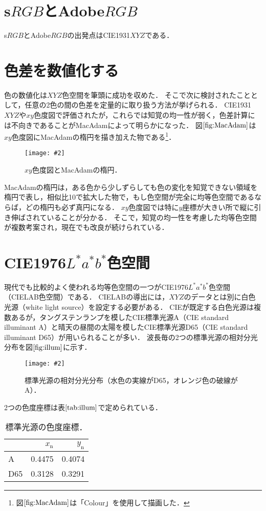 \documentclass[uplatex,paper=a4,fontsize=4.0truemm,jafontsize=4.0truemm,head_space=30.0truemm,foot_space=30.0truemm,baselineskip=8.0truemm,line_length=40zw,gutter=25.0truemm,oneside,openany,fleqn,hanging_panctuation,open_bracket_pos=nibu_tentsuki,dvipdfmx,jis2004,book,titlepage]{jlreq}
\theoremstyle{mystyle}
\newcommand{\captiondot}[1]{\caption{#1．}}
\newcommand{\figureinput}[4]{\begin{figure}[tbp]\centering\texttt{[image: \#2]}\captiondot{#3}\label{fig:#4}\end{figure}}
\newcommand{\tableinput}[4]{\begin{table}[tbp]\centering\captiondot{#3}\label{tab:#4}\begin{tabular}{#1}#2\end{tabular}\end{table}}
\newcommand{\mathdisplaystyle}[1]{\(\displaystyle{#1}\)}
\newcommand{\Reference}[1]{\mathdisplaystyle{\ref{#1}}}
\begin{document}
		\section{s\mathdisplaystyle{RGB}とAdobe\mathdisplaystyle{RGB}}
			s\mathdisplaystyle{RGB}とAdobe\mathdisplaystyle{RGB}の出発点はCIE1931\mathdisplaystyle{XYZ}である．
		\section{色差を数値化する}
			色の数値化は\mathdisplaystyle{XYZ}色空間を筆頭に成功を収めた．
			そこで次に検討されたこととして，任意の2色の間の色差を定量的に取り扱う方法が挙げられる．
			CIE1931\mathdisplaystyle{XYZ}や\mathdisplaystyle{xy}色度図で評価されたが，これらでは知覚の均一性が弱く，色差計算には不向きであることがMacAdamによって明らかになった\cite{MacAdam1942}．
			図\Reference{fig:MacAdam}は\mathdisplaystyle{xy}色度図にMacAdamの楕円を描き加えた物である\footnote{図\Reference{fig:MacAdam}は「Colour」を使用して描画した．}．
			\figureinput{width=\linewidth}{D:/a/figs/MacAdam.png}{\mathdisplaystyle{xy}色度図とMacAdamの楕円}{MacAdam}
			MacAdamの楕円は，ある色から少しずらしても色の変化を知覚できない領域を楕円で表し，相似比10で拡大した物で，もし色空間が完全に均等色空間であるならば，どの楕円も必ず真円になる．
			\mathdisplaystyle{xy}色度図では特に\mathdisplaystyle{y}座標が大きい所で縦に引き伸ばされていることが分かる．
			そこで，知覚の均一性を考慮した均等色空間が複数考案され，現在でも改良が続けられている．
		\section{CIE1976\mathdisplaystyle{L^\ast a^\ast b^\ast}色空間}
			現代でも比較的よく使われる均等色空間の一つがCIE1976\mathdisplaystyle{L^\ast a^\ast b^\ast}色空間（CIELAB色空間）である．
			CIELABの導出には，\mathdisplaystyle{XYZ}のデータとは別に白色光源（white light source）を設定する必要がある．
			CIEが既定する白色光源は複数あるが，タングステンランプを模したCIE標準光源A（CIE standard illuminant A）と晴天の昼間の太陽を模したCIE標準光源D65（CIE standard illuminant D65）が用いられることが多い．
			波長毎の2つの標準光源の相対分光分布を図\Reference{fig:illum}に示す．
			\figureinput{width=\linewidth}{D:/a/figs/illuminant.png}{標準光源の相対分光分布（水色の実線がD65，オレンジ色の破線がA）}{illum}
			2つの色度座標は表\Reference{tab:illum}で定められている．
			\tableinput{l|rr}{ & \(x_\textrm{n}\) & \(y_\textrm{n}\) \\ \hline
				A & 0.4475 & 0.4074 \\
				D65 & 0.3128 & 0.3291}{標準光源の色度座標}{illum}
\end{document}
